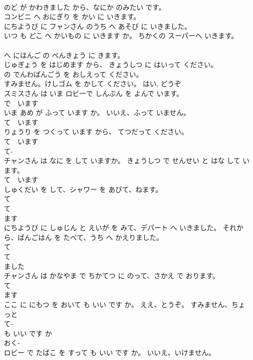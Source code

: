 \documentclass[8pt]{extreport}
\begin{document}
\begin{CJK}{UTF8}{min}
\\	のど が かわきました から、なにか のみたい です。	
\\	コンビニ へ おにぎり を かい に いきます。	
\\	にちようび に フャンさん のうち へ あそび に いきました。	
\\	いつ も どこ へ かいもの に いきます か。 ちかくの スーパーへ いきます。	
\\	[わたしは]
\\	へ にほんご の べんきょう に きます。	
\\	じゅぎょう を はじめます から、 きょうしつ に はいって ください。	
\\	の でんわばんごう を おしえって ください。	
\\	すみません。けしゴム を かして ください。 はい, どうぞ	
\\	スミスさん は いま ロビ一で しんぶん を よんで います。	
\\	で　います 
\\	いま あめ が ふって います か。 いいえ、ふって いません。	
\\	て　います 
\\	りょうり を つくって います から、 てつだって ください。	
\\	て　います 
\\	て- 
\\	チャンさん は なに を して いますか。 きょうしつ で せんせい と はな して います。	
\\	て　います 
\\	しゅくだい を して、シャワー を あびて、ねます。	
\\	て 
\\	て 
\\	ます 
\\	にちようび に しゅじん と えいが を みて、デパート へ いきました。 それから、ばんごはん を たべて、うち へ かえりました。	
\\	て 
\\	て 
\\	ました 
\\	チャンさん は かなやま で ちかてつ に のって、さかえ で おります。	
\\	て　
\\	ます 
\\	ここ に にもつ を おいて も いい です か。 ええ、とうぞ。 すみません、ちょっと	
\\	て-
\\	も いい です か 
\\	おく- 
\\	ロビー で たばこ を すって も いい です か。 いいえ、いけません。	

\end{CJK}
\end{document}
